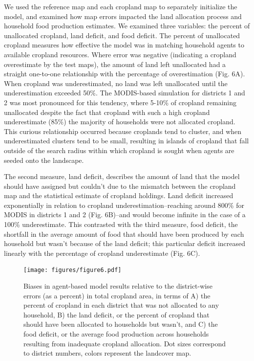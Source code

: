 \documentclass{pnastwo}
\begin{document}
\begin{article}
We used the reference map and each cropland map to separately initialize the model, and examined how map errors impacted the land allocation process and household food production estimates. We examined three variables: the percent of unallocated cropland, land deficit, and food deficit. The percent of unallocated cropland measures how effective the model was in matching household agents to available cropland resources. Where error was negative (indicating a cropland overestimate by the test maps), the amount of land left unallocated had a straight one-to-one relationship with the percentage of overestimation (Fig. 6A). When cropland was underestimated, no land was left unallocated until the underestimation exceeded 50\%. The MODIS-based simulation for districts 1 and 2 was most pronounced for this tendency, where 5-10\% of cropland remaining unallocated despite the fact that cropland with such a high cropland underestimate (85\%) the majority of households were not allocated cropland. This curious relationship occurred because croplands tend to cluster, and when underestimated clusters tend to be small, resulting in islands of cropland that fall outside of the search radius within which cropland is sought when agents are seeded onto the landscape. 

The second measure, land deficit, describes the amount of land that the model should have assigned but couldn't due to the mismatch between the cropland map and the statistical estimate of cropland holdings. Land deficit increased exponentially in relation to cropland underestimation--reaching around 800\% for MODIS in districts 1 and 2 (Fig. 6B)--and would become infinite in the case of a 100\% underestimate. This contrasted with the third measure, food deficit, the shortfall in the average amount of food that should have been produced by each household but wasn't because of the land deficit; this particular deficit increased linearly with the percentage of cropland underestimate (Fig. 6C). 


\begin{figure}[!ht]
\centerline{\texttt{[image: figures/figure6.pdf]}}
\caption{Biases in agent-based model results relative to the district-wise errors (as a percent) in total cropland area, in terms of A) the percent of cropland in each district that was not allocated to any household, B) the land deficit, or the percent of cropland that should have been allocated to households but wasn't, and C) the food deficit, or the average food production across households resulting from inadequate cropland allocation. Dot sizes correspond to district numbers, colors represent the landcover map.}
\label{afoto}
\end{figure}


\end{article}
\end{document}
